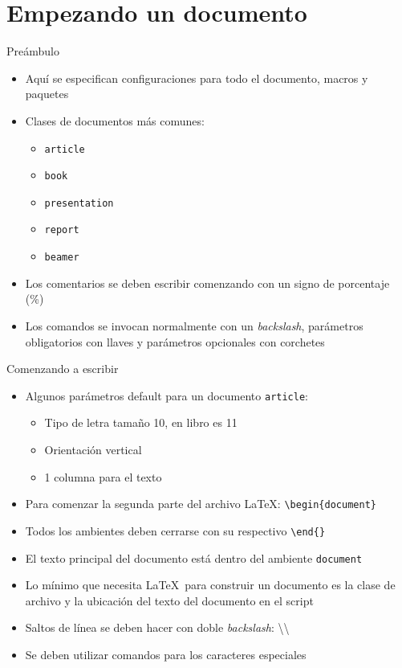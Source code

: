 \documentclass{beamer}
\begin{document}
\section{Empezando un documento}
\begin{frame}{Preámbulo}
\begin{itemize}
    \item Aquí se especifican configuraciones para todo el documento, macros y paquetes
    \item Clases de documentos más comunes: 
    \begin{itemize}
        \item \texttt{article}
        \item \texttt{book}
        \item  \texttt{presentation}
        \item \texttt{report}
        \item \texttt{beamer}
        \end{itemize}
\item Los comentarios se deben escribir comenzando con un signo de porcentaje (\%)
\item Los comandos se invocan normalmente con un \textit{backslash}, parámetros obligatorios con llaves y parámetros opcionales con corchetes
\end{itemize}
\end{frame}
\begin{frame}{Comenzando a escribir}
\begin{itemize}
    \item Algunos parámetros default para un documento \texttt{article}:
    \begin{itemize}
        \item Tipo de letra tamaño 10, en libro es 11
        \item Orientación vertical
        \item 1 columna para el texto
    \end{itemize}
\item Para comenzar la segunda parte del archivo \LaTeX:
\texttt{\textbackslash begin\{document\}}
\item Todos los ambientes deben cerrarse con su respectivo \texttt{\textbackslash end\{\}}
\item El texto principal del documento está dentro del ambiente \texttt{document}
\item Lo mínimo que necesita \LaTeX \ para construir un documento es la clase de archivo y la ubicación del texto del documento en el script
\item Saltos de línea se deben hacer con doble \textit{backslash}: \textbackslash \textbackslash
\item Se deben utilizar comandos para los caracteres especiales
\end{itemize}
\end{frame}
\end{document}
